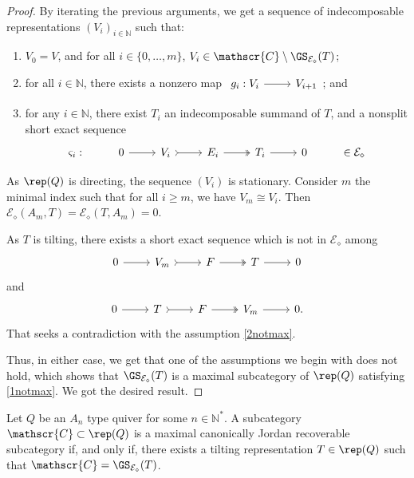 \begin{proof}
By iterating the previous arguments, we get a sequence of indecomposable representations $(V_i)_{i \in \mathbb{N}}$ such that:
\begin{enumerate}[label=$\bullet$, itemsep=1mm]
    \item $V_0 = V$, and for all $i \in \{0,\ldots,m\}$,  $V_i \in \mathscr{C} \setminus \GS_{\mathcal{E}_\diamond}(T)$;
    \item for all $i \in \mathbb{N}$, there exists a nonzero map $\begin{tikzcd}
        g_i : V_i & V_{i+1} 
	\arrow[from=1-1, to=1-2]
\end{tikzcd}$; and
    \item  for any $i \in \mathbb{N}$, there exist $T_i$ an indecomposable summand of $T$, and a nonsplit short exact sequence \[\begin{tikzcd}
	 \varsigma_i : & 0 & V_i & E_i & T_i &  0 & \in \mathcal{E}_\diamond
	\arrow[from=1-2, to=1-3]
	\arrow[tail, from=1-3, to=1-4]
	\arrow[two heads,from=1-4, to=1-5]
	\arrow[from=1-5, to=1-6]
\end{tikzcd}\]
\end{enumerate}

As $\rep(Q)$ is directing, the sequence $(V_i)$ is stationary. Consider $m$ the minimal index such that for all $i \geqslant m$, we have $V_m \cong V_i$. Then $\mathcal{E}_\diamond(A_m,T) = \mathcal{E}_\diamond(T,A_m) = 0$.

As $T$ is tilting, there exists a short exact sequence which is not in $\mathcal{E}_\diamond$ among 
\[\begin{tikzcd}
	 0 & V_m & F & T &  0 
	\arrow[from=1-1, to=1-2]
	\arrow[tail, from=1-2, to=1-3]
	\arrow[two heads,from=1-3, to=1-4]
	\arrow[from=1-4, to=1-5]
\end{tikzcd}\] and \[\begin{tikzcd}
	 0 & T & F & V_m &  0 .
	\arrow[from=1-1, to=1-2]
	\arrow[tail, from=1-2, to=1-3]
	\arrow[two heads,from=1-3, to=1-4]
	\arrow[from=1-4, to=1-5]
\end{tikzcd}\] That seeks a contradiction with the assumption \ref{2notmax}.

Thus, in either case, we get that one of the assumptions we begin with does not hold, which shows that $\GS_{\mathcal{E}_\diamond}(T)$ is a maximal subcategory of $\rep(Q)$ satisfying \ref{1notmax}. We got the desired result.
\end{proof}


\begin{theorem}
\label{th:mCJR=GS}
Let $Q$ be an $A_n$ type quiver for some $n \in \mathbb{N}^*$. A subcategory $\mathscr{C} \subset \rep(Q)$ is a maximal canonically Jordan recoverable subcategory if, and only if, there exists a tilting representation $T \in \rep(Q)$ such that $\mathscr{C} = \GS_{\mathcal{E_\diamond}}(T)$.
\end{theorem}

